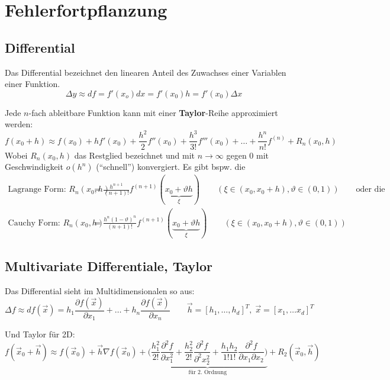 \section{Fehlerfortpflanzung}

\subsection{Differential}
  Das Differential bezeichnet den linearen Anteil des Zuwachses einer Variablen einer Funktion.
  $$\Delta y \approx df = f'(x_o) dx = f'(x_0) h = f'(x_0) \Delta x$$
  
  Jede $n$-fach ableitbare Funktion kann mit einer \textbf{Taylor}-Reihe approximiert werden:
  $$f(x_0+h) \approx f(x_0) + h f'(x_0) + \frac{h^2}{2} f''(x_0) + \frac{h^3}{3!} f'''(x_0) + 
  \ldots + \frac{h^n}{n!} f^{(n)} + R_n(x_0,h)$$
  Wobei $R_n(x_0,h)$ das Restglied bezeichnet und mit $n \rightarrow \infty$ gegen $0$ mit 
  Geschwindigkeit $o(h^n)$ ("`schnell"') konvergiert. Es gibt bspw. die 
  \begin{align}
    \text{Lagrange Form: } R_n(x_0,h) &= \frac{h^{n+1}}{(n+1)!} f^{(n+1)}(\underbrace{x_0 + \vartheta h}_{\xi})
    \qquad (\xi \in (x_0, x_0+h), \vartheta \in (0,1)) \qquad \text{oder die }\\
    \text{Cauchy Form: } R_n(x_0,h) &= \frac{h^n(1-\vartheta)^n}{(n+1)!} f^{(n+1)}(\underbrace{x_0 + \vartheta h}_{\xi})
    \qquad (\xi \in (x_0, x_0+h), \vartheta \in (0,1))
  \end{align}
  
  
   
\subsection{Multivariate Differentiale, Taylor}
  Das Differential sieht im Multidimensionalen so aus:
  $$\Delta f \approx df(\vec{x}) = h_1 \frac{\partial f(\vec{x})}{\partial x_1} + \ldots + 
  h_n \frac{\partial f(\vec{x})}{\partial x_n} \qquad \vec{h} = [h_1, \ldots, h_d]^T, \; \vec{x} = [x_1, \ldots x_d]^T$$

  Und Taylor für 2D:
  $$f(\vec{x}_0 + \vec{h}) \approx f(\vec{x}_0) + \vec{h} \nabla f(\vec{x}_0) +
  \underbrace{\bigg( \frac{h_1^2}{2!} \frac{\partial^2 f}{\partial x_1^2} + \frac{h_2^2}{2!} \frac{\partial^2 f}{\partial^2 x_2^2}
  + \frac{h_1 h_2}{1!1!} \frac{\partial^2 f}{\partial x_1 \partial x_2}\bigg)}_{\text{für 2. Ordnung}} + R_2(\vec{x}_0, \vec{h})$$

